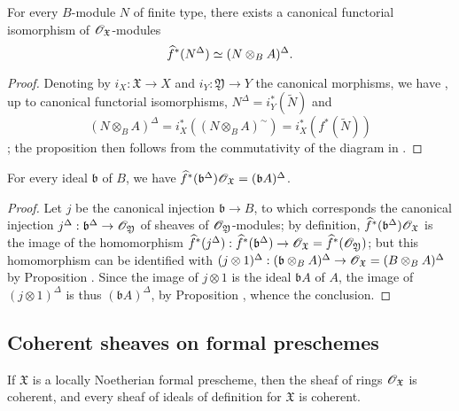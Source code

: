 \begin{proposition}[10.10.8]
\label{1.10.10.8}
For every $B$-module $N$ of finite type, there exists a canonical functorial isomorphism of $\mathscr{O}_\mathfrak{X}$-modules
\[
  \widehat{f}^*(N^\Delta)\simeq(N\otimes_B A)^\Delta.
\]
\end{proposition}

\begin{proof}
\label{proof-1.10.10.8}
Denoting by $i_X:\mathfrak{X}\to X$ and $i_Y:\mathfrak{Y}\to Y$ the canonical morphisms, we have , up to canonical functorial isomorphisms, $N^\Delta=i_Y^*(\widetilde{N})$ and
\[
  (N\otimes_B A)^\Delta=i_X^*((N\otimes_B A)^\sim)=i_X^*(f^*(\widetilde{N}))
\]
; the proposition then follows from the commutativity of the diagram in .
\end{proof}

\begin{corollary}
\label{1.10.10.9}
For every ideal $\mathfrak{b}$ of $B$, we have $\widehat{f}^*(\mathfrak{b}^\Delta)\mathscr{O}_\mathfrak{X}=(\mathfrak{b}A)^\Delta$.
\end{corollary}

\begin{proof}
\label{proof-1.10.10.9}
Let $j$ be the canonical injection $\mathfrak{b}\to B$, to which corresponds the canonical injection $j^\Delta:\mathfrak{b}^\Delta\to\sh{O}_\mathfrak{Y}$ of sheaves of $\mathscr{O}_\mathfrak{Y}$-modules; by definition, $\widehat{f}^*(\mathfrak{b}^\Delta)\mathscr{O}_\mathfrak{X}$ is the image of the homomorphism $\widehat{f}^*(j^\Delta):\widehat{f}^*(\mathfrak{b}^\Delta)\to\sh{O}_\mathfrak{X}=\widehat{f}^*(\sh{O}_\mathfrak{Y})$; but this homomorphism can be identified with $(j\otimes 1)^\Delta:(\mathfrak{b}\otimes_B A)^\Delta\to\sh{O}_\mathfrak{X}=(B\otimes_B A)^\Delta$ by Proposition .
Since the image of $j\otimes 1$ is the ideal $\mathfrak{b}A$ of $A$, the image of $(j\otimes 1)^\Delta$ is thus $(\mathfrak{b}A)^\Delta$, by Proposition , whence the conclusion.
\end{proof}

\subsection{Coherent sheaves on formal preschemes}
\label{subsection:1.10.11}

\begin{proposition}[10.11.1]
\label{1.10.11.1}
If $\mathfrak{X}$ is a locally Noetherian formal prescheme, then the sheaf of rings $\mathscr{O}_\mathfrak{X}$ is coherent, and every sheaf of ideals of definition for $\mathfrak{X}$ is coherent.
\end{proposition}

